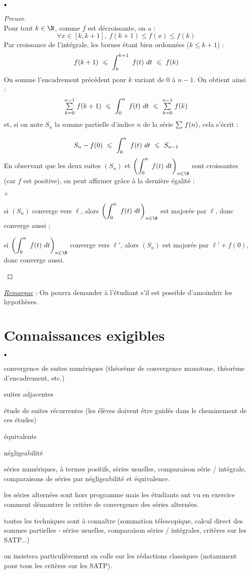 \documentclass[11pt]{article}%
\begin{document}
\begin{noliste}{$\scriptstyle \bullet$}
\begin{proof}[Preuve]~\\
Pour tout $k \in \N$, comme $f$ est décroissante, on a :
\[
  \forall x \in [k,k+1], \ f(k+1) \leq f(x) \leq f(k)
\]
Par croissance de l'intégrale, les bornes étant bien ordonnées 
($k\leq k+1$) :
\[
  f(k+1) \ \leq \ \dint{k}{k+1} f(t) \dt \ \leq \ f(k)
\]
On somme l'encadrement précédent pour $k$ variant de $0$ à 
$n-1$. On obtient ainsi :
\[
  \Sum{k=0}{n-1} f(k+1) \ \leq \ \dint{0}{n} f(t) \dt
  \ \leq \ \Sum{k=0}{n-1} f(k)
\]
et, si on note $S_n$ la somme partielle d'indice $n$ de la série 
${\textstyle\sum\limits_{}^{}}\hspace{.1cm} f(n)$, cela s'écrit :
\[
  S_n-f(0) \ \leqslant \ \displaystyle \int_{0}^{n}\ f(t) \ dt \ \leqslant \ S_{n-1}
\]
En observant que les deux suites $(S_n)$ et $\left( \dint{0}{n} f(t) 
\dt \right)_{n\in\N}$ sont croissantes (car $f$ est positive), on 
peut affirmer grâce à la dernière égalité :
\begin{noliste}{$\scriptstyle \times$}
  \item si $(S_n)$ converge vers $\ell$, alors $\left( \dint{0}{n} 
  f(t) \dt \right)_{n\in\N}$ est majorée par $\ell$, donc converge 
  aussi ;

  \item si $\left( \dint{0}{n} f(t) \dt \right)_{n\in\N}$ converge 
  vers $\ell'$, alors $(S_n)$ est majorée par $\ell' + f(0)$, donc 
  converge aussi.
\end{noliste}
\end{proof}

  \underline{{\it Remarque}} : On pourra demander à l'étudiant s'il 
  est possible d'amoindrir les hypothèses.
\end{noliste}


\section*{Connaissances exigibles}

\begin{noliste}{$\scriptstyle \bullet$}
\item convergence de suites numériques (théorème de convergence 
monotone, théorème d'encadrement, etc.)
\item suites adjacentes
\item étude de suites récurrentes (les élèves doivent être guidés dans 
le cheminement de ces études)
\item équivalents
\item négligeabilité
\item séries numériques, à termes positifs, séries usuelles, comparaison 
série / intégrale, comparaisons de séries par négligeabilité et 
équivalence.
\item les séries alternées sont hors programme mais les étudiants ont vu 
en exercice comment démontrer le critère de convergence des séries 
alternées.
\item toutes les techniques sont à connaître (sommation télescopique, 
calcul direct des sommes partielles - séries usuelles, comparaison 
séries / intégrales, critères sur les SATP...)
\item on insistera particulièrement en colle sur les rédactions 
classiques (notamment pour tous les critères sur les SATP).
\end{noliste}
\end{document}
